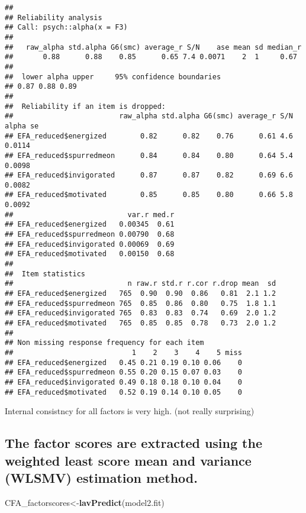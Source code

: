 \documentclass[
]{article}
\newenvironment{Shaded}{\begin{snugshade}}{\end{snugshade}}
\newcommand{\KeywordTok}[1]{\textcolor[rgb]{0.13,0.29,0.53}{\textbf{#1}}}
\newcommand{\NormalTok}[1]{#1}
\begin{document}
\begin{verbatim}
## 
## Reliability analysis   
## Call: psych::alpha(x = F3)
## 
##   raw_alpha std.alpha G6(smc) average_r S/N    ase mean sd median_r
##       0.88      0.88    0.85      0.65 7.4 0.0071    2  1     0.67
## 
##  lower alpha upper     95% confidence boundaries
## 0.87 0.88 0.89 
## 
##  Reliability if an item is dropped:
##                         raw_alpha std.alpha G6(smc) average_r S/N alpha se
## EFA_reduced$energized        0.82      0.82    0.76      0.61 4.6   0.0114
## EFA_reduced$spurredmeon      0.84      0.84    0.80      0.64 5.4   0.0098
## EFA_reduced$invigorated      0.87      0.87    0.82      0.69 6.6   0.0082
## EFA_reduced$motivated        0.85      0.85    0.80      0.66 5.8   0.0092
##                           var.r med.r
## EFA_reduced$energized   0.00345  0.61
## EFA_reduced$spurredmeon 0.00790  0.68
## EFA_reduced$invigorated 0.00069  0.69
## EFA_reduced$motivated   0.00150  0.68
## 
##  Item statistics 
##                           n raw.r std.r r.cor r.drop mean  sd
## EFA_reduced$energized   765  0.90  0.90  0.86   0.81  2.1 1.2
## EFA_reduced$spurredmeon 765  0.85  0.86  0.80   0.75  1.8 1.1
## EFA_reduced$invigorated 765  0.83  0.83  0.74   0.69  2.0 1.2
## EFA_reduced$motivated   765  0.85  0.85  0.78   0.73  2.0 1.2
## 
## Non missing response frequency for each item
##                            1    2    3    4    5 miss
## EFA_reduced$energized   0.45 0.21 0.19 0.10 0.06    0
## EFA_reduced$spurredmeon 0.55 0.20 0.15 0.07 0.03    0
## EFA_reduced$invigorated 0.49 0.18 0.18 0.10 0.04    0
## EFA_reduced$motivated   0.52 0.19 0.14 0.10 0.05    0
\end{verbatim}

Internal consistncy for all factors is very high. (not really
surprising)

\hypertarget{the-factor-scores-are-extracted-using-the-weighted-least-score-mean-and-variance-wlsmv-estimation-method.}{%
\subsection{The factor scores are extracted using the weighted least
score mean and variance (WLSMV) estimation
method.}\label{the-factor-scores-are-extracted-using-the-weighted-least-score-mean-and-variance-wlsmv-estimation-method.}}

\begin{Shaded}
\begin{Highlighting}[]
\NormalTok{CFA\_factorscores\textless{}{-}}\KeywordTok{lavPredict}\NormalTok{(model2.fit)}
\end{Highlighting}
\end{Shaded}
\end{document}
